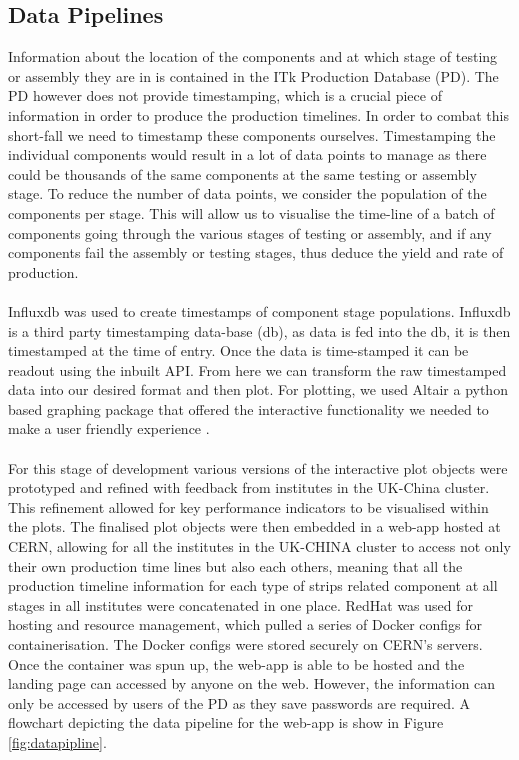 \subsection{Data Pipelines}
Information about the location of the components and at which stage of testing or assembly they are in is contained in the ITk Production Database (PD). The PD however does not provide timestamping, which is a crucial piece of information in order to produce the production timelines. In order to combat this short-fall we need to timestamp these components ourselves. Timestamping the individual components would result in a lot of data points to manage as there could be thousands of the same components at the same testing or assembly stage. To reduce the number of data points, we consider the population of the components per stage. This will allow us to visualise the time-line of a batch of components going through the various stages of testing or assembly, and if any components fail the assembly or testing stages, thus deduce the yield and rate of production. 
\\
\\
Influxdb \cite{influx} was used to create timestamps of component stage populations. Influxdb is a third party timestamping data-base (db), as data is fed into the db, it is then timestamped at the time of entry. Once the data is time-stamped it can be readout using the inbuilt API. From here we can transform the raw timestamped data into our desired format and then plot. For plotting, we used Altair a python based graphing package that offered the interactive functionality we needed to make a user friendly experience \cite{altair}.
\\
\\
For this stage of development various versions of the interactive plot objects were prototyped and refined with feedback from institutes in the UK-China cluster. This refinement allowed for key performance indicators to be visualised within the plots. The finalised plot objects were then embedded in a web-app hosted at CERN, allowing for all the institutes in the UK-CHINA cluster to access not only their own production time lines but also each others, meaning that all the production timeline information for each type of strips related component at all stages in all institutes were concatenated in one place. RedHat was used for hosting and resource management, which pulled a series of Docker configs for containerisation. The Docker configs were stored securely on CERN's servers. Once the container was spun up, the web-app is able to be hosted and the landing page can accessed by anyone on the web. However, the information can only be accessed by users of the PD as they save passwords are required. A flowchart depicting the data pipeline for the web-app is show in Figure \ref{fig:datapipline}.
